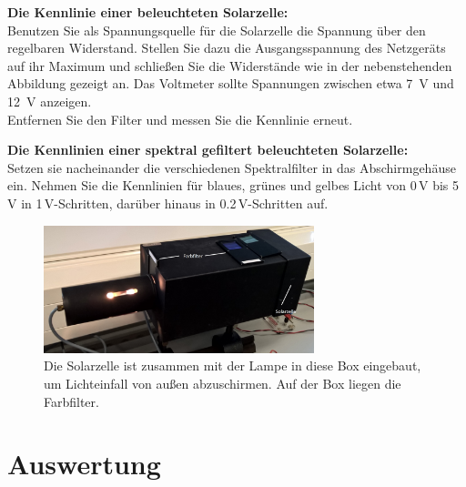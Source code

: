 \begin{enumerate}
	\begin{minipage}{0.5\textwidth}
			\item \textbf{Die Kennlinie einer beleuchteten Solarzelle:}\\
		Benutzen Sie als Spannungsquelle für die Solarzelle die Spannung über den regelbaren Widerstand. Stellen Sie dazu die Ausgangsspannung des Netzgeräts auf ihr Maximum und schließen Sie die Widerstände wie in der nebenstehenden Abbildung gezeigt an. Das Voltmeter sollte Spannungen zwischen etwa 7~V und 12~V anzeigen.\\
		Entfernen Sie den Filter und messen Sie die Kennlinie erneut.
		\vfill
	\end{minipage}
	\begin{minipage}{0.45\textwidth}
		\hfill
		
		\label{fig:solarzelle }
		\end{minipage}
	\item \textbf{Die Kennlinien einer spektral gefiltert beleuchteten Solarzelle:}\\
		Setzen sie nacheinander die verschiedenen Spektralfilter in das Abschirmgehäuse ein. Nehmen Sie die Kennlinien für blaues, grünes und gelbes Licht von 0\,V bis 5\,V in 1\,V-Schritten, darüber hinaus in 0.2\,V-Schritten auf.
\end{enumerate}

\begin{figure}[h]
	\centering
	\includegraphics[width=0.7\textwidth]{Abbildungen/Solarzelle_gross.jpg}
	\caption{Die Solarzelle ist zusammen mit der Lampe in diese Box eingebaut, um Lichteinfall von außen abzuschirmen. Auf der Box liegen die Farbfilter.}
\end{figure}

\section{Auswertung} 

